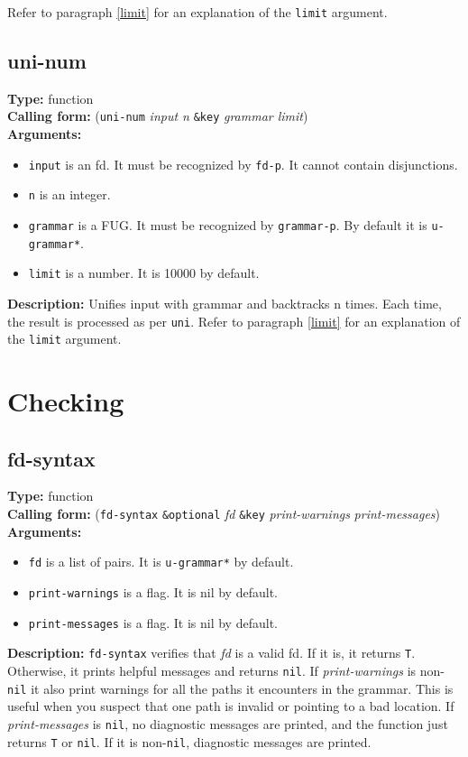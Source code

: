 \documentclass[10pt,a4paper]{report}
\begin{document}
Refer to paragraph \ref{limit} for an explanation of the {\tt limit} argument.

\subsection{uni-num}
{\bf Type:} function
\\{\bf Calling form:} ({\tt uni-num} {\em input n} {\tt \&key} {\em grammar limit})
\\{\bf Arguments:} 
\begin{itemize}
\item {\tt input} is an fd. It must be recognized by {\tt fd-p}. It cannot contain
disjunctions. 

\item {\tt n} is an integer.

\item {\tt grammar} is a FUG.  It must be recognized by {\tt grammar-p}.  By default
it is {\tt *u-grammar*}.

\item {\tt limit} is a number.  It is 10000 by default.
\end{itemize}
{\bf Description:} Unifies input with grammar and backtracks n times.  Each
time, the result is processed as per {\tt uni}.
Refer to paragraph \ref{limit} for an explanation of the {\tt limit} argument.




\section{Checking}

\subsection{fd-syntax}
{\bf Type:} function
\\{\bf Calling form:} ({\tt fd-syntax} {\tt \&optional}  {\em fd}  {\tt \&key}
{\em print-warnings} {\em print-messages})
\\{\bf Arguments:} 
\begin{itemize}
\item {\tt fd} is a list of pairs. It is {\tt *u-grammar*} by default.

\item {\tt print-warnings} is a flag. It is nil by default.

\item {\tt print-messages} is a flag. It is nil by default.
\end{itemize}
{\bf Description:} {\tt fd-syntax} verifies that {\em fd} is a valid fd. If
it is, it returns {\tt T}. Otherwise, it prints helpful messages
and returns {\tt nil}. If {\em print-warnings} is non-{\tt nil} it also
print warnings for all the paths it encounters in the grammar.
This is useful when you suspect that one path is invalid or
pointing to a bad location.  If {\em print-messages} is {\tt nil}, no
diagnostic messages are printed, and the function just returns {\tt T} or
{\tt nil}.  If it is non-{\tt nil}, diagnostic messages are printed.
\end{document}
